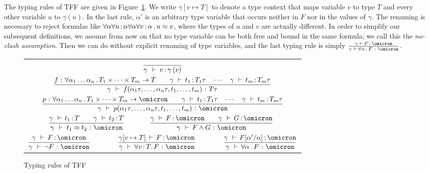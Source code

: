 The typing rules of TFF are given in Figure~\ref{fig:typing}.
We write $\gamma[v \mapsto T]$ to denote a type context that maps
variable $v$ to type $T$ and every other variable $u$ to $\gamma(u)$.
In the last rule, $\alpha'$ is an arbitrary type variable that
occurs neither in $F$ nor in the values of $\gamma$.
The renaming is necessary to reject formulas like
$\forall\alpha\forall u\operatorname{:}\alpha\forall\alpha\forall v\operatorname{:}\alpha \,.\,
u \approx v$, where the types of $u$ and $v$ are actually different.
In order to simplify our subsequent definitions, we assume from now on
that no type variable can be both free and bound in the same formula;
we call this the {\em no-clash assumption}.
Then we can do without explicit renaming of type variables,
and the last typing rule is simply
$\frac{\gamma\, \,\vdash\, F \ty \omicron}{
\gamma\, \,\vdash\, \forall \alpha \,.\, F \,\ty\, \omicron}$.

\begin{figure}
\begin{center}
\begin{tabular}{c@{\qquad\qquad}c}
\multicolumn{2}{c}{$\displaystyle
\frac{}{\gamma\, \:\vdash\: v \operatorname{:} \gamma\,(v)}$} \\[4ex]
\multicolumn{2}{c}{$\displaystyle
\frac{f \,\operatorname{:}\, \forall \alpha_1\dots\alpha_n \,.\,
    T_1 \times \dots \times T_m \to T
\qquad
\gamma\, \,\vdash\, t_1 \operatorname{:} T_1\tau
\quad\cdots\quad
\gamma\, \,\vdash\, t_m \operatorname{:} T_m\tau
}{\gamma\, \:\vdash\:
f(\alpha_1\tau,\dots,\alpha_n\tau,t_1,\dots,t_m) \,\operatorname{:}\, T\tau}
$} \\[4ex]
\multicolumn{2}{c}{$\displaystyle
\frac{p \,\ty\, \forall \alpha_1\dots\alpha_n \,.\,
    T_1 \times \dots \times T_m \to \omicron
\qquad
\gamma\, \,\vdash\, t_1 \ty T_1\tau
\quad\cdots\quad
\gamma\, \,\vdash\, t_m \ty T_m\tau
}{\gamma\, \:\vdash\:
p(\alpha_1\tau,\dots,\alpha_n\tau,t_1,\dots,t_m) \,\ty\, \omicron}
$} \\[4ex]
$\qquad\displaystyle
\frac{\gamma\, \,\vdash\, t_1 \ty T \qquad \gamma\, \,\vdash\, t_2 \ty T}{
\gamma\, \:\vdash\: t_1 \approx t_2 \,\ty\, \omicron}$ &
$\displaystyle
\frac{\gamma\, \,\vdash\, F \ty \omicron \qquad
\gamma\, \,\vdash\, G \ty \omicron}{
\gamma\, \,\vdash\, F \land G \,\ty\, \omicron}\qquad$ \\[4ex]
\multicolumn{2}{c}{
$\displaystyle
\frac{\gamma\, \,\vdash\, F \ty \omicron}{
\gamma\, \,\vdash\, \lnot F \,\ty\, \omicron}\qquad\qquad
\frac{\gamma[v \mapsto T] \,\vdash\, F \ty \omicron}{
\gamma\, \,\vdash\, \forall v \ty T .\, F \,\ty\, \omicron}\qquad\qquad
\frac{\gamma\, \,\vdash\, F[\alpha'/\alpha] \ty \omicron}{
\gamma\, \,\vdash\, \forall \alpha \,.\, F \,\ty\, \omicron}$}
\end{tabular}
\end{center}
\caption{Typing rules of TFF}
\label{fig:typing}
\end{figure}

